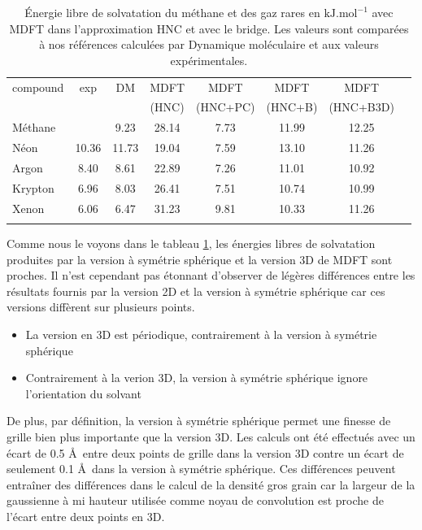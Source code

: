\begin{table}[h]
  \centering
  \begin{tabular}{ l c c c c c c c }
    \hline & \\[-1em]\hline
    compound   & exp  & DM & MDFT & MDFT & MDFT  & MDFT \\
               &      &    & (HNC)  & (HNC+PC)  & (HNC+B) & (HNC+B3D) \\
    \hline
    Méthane    &       &  9.23 & 28.14 & 7.73 & 11.99 & 12.25 \\
    Néon       & 10.36 & 11.73 & 19.04 & 7.59 & 13.10 & 11.26 \\
    Argon      &  8.40 &  8.61 & 22.89 & 7.26 & 11.01 & 10.92 \\
    Krypton    &  6.96 &  8.03 & 26.41 & 7.51 & 10.74 & 10.99 \\
    Xenon      &  6.06 &  6.47 & 31.23 & 9.81 & 10.33 & 11.26 \\
    \hline & \\[-1em]\hline
  \end{tabular}
  \caption[\'Energie libre de solvatation du méthane et des gaz rares.]{\'Energie libre de solvatation du méthane et des gaz rares en $\mathrm{kJ}.\mathrm{mol}^{-1}$ avec MDFT dans l'approximation HNC et avec le bridge. Les valeurs sont comparées à nos références calculées par Dynamique moléculaire et aux valeurs expérimentales\cite{straatsma_free_1986}.}
  \label{tab:deltag_1D_3D}  
\end{table}

Comme nous le voyons dans le tableau \ref{tab:deltag_1D_3D}, les énergies libres de solvatation produites par la version à symétrie sphérique et la version 3D de MDFT sont proches. Il n'est cependant pas étonnant d'observer de légères différences entre les résultats fournis par la version 2D et la version à symétrie sphérique car ces versions diffèrent sur plusieurs points. 

\begin{itemize}
\item La version en 3D est périodique, contrairement à la version à symétrie sphérique
\item Contrairement à la verion 3D, la version à symétrie sphérique ignore l'orientation du solvant
\end{itemize}

De plus, par définition, la version à symétrie sphérique permet une finesse de grille bien plus importante que la version 3D. Les calculs ont été effectués avec un écart de 0.5 \AA\ entre deux points de grille dans la version 3D contre un écart de seulement 0.1 \AA\ dans la version à symétrie sphérique. Ces différences peuvent entraîner des différences dans le calcul de la densité gros grain car la largeur de la gaussienne à mi hauteur utilisée comme noyau de convolution est proche de l'écart entre deux points en 3D.

